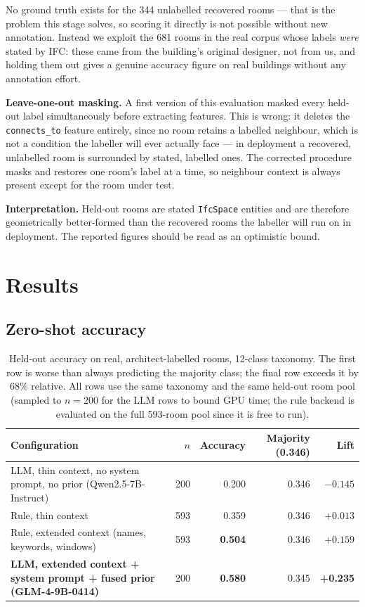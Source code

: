 \documentclass[11pt,a4paper]{article}
\begin{document}
No ground truth exists for the 344 unlabelled recovered rooms --- that is the
problem this stage solves, so scoring it directly is not possible without new
annotation. Instead we exploit the 681 rooms in the real corpus whose labels
\emph{were} stated by IFC: these came from the building's original designer,
not from us, and holding them out gives a genuine accuracy figure on real
buildings without any annotation effort.

\textbf{Leave-one-out masking.} A first version of this evaluation masked
every held-out label simultaneously before extracting features. This is
wrong: it deletes the \texttt{connects\_to} feature entirely, since no room
retains a labelled neighbour, which is not a condition the labeller will ever
actually face --- in deployment a recovered, unlabelled room is surrounded by
stated, labelled ones. The corrected procedure masks and restores one room's
label at a time, so neighbour context is always present except for the room
under test.

\textbf{Interpretation.} Held-out rooms are stated \texttt{IfcSpace} entities
and are therefore geometrically better-formed than the recovered rooms the
labeller will run on in deployment. The reported figures should be read as an
optimistic bound.

\section{Results}

\subsection{Zero-shot accuracy}

\begin{table}[h]
\centering
\small
\begin{tabular}{@{}lrrrr@{}}
\toprule
\textbf{Configuration} & $n$ & \textbf{Accuracy} & \textbf{Majority (0.346)} &
\textbf{Lift} \\
\midrule
LLM, thin context, no system prompt, no prior (Qwen2.5-7B-Instruct)
  & 200 & 0.200 & 0.346 & $-0.145$ \\
Rule, thin context & 593 & 0.359 & 0.346 & $+0.013$ \\
\addlinespace
Rule, extended context (names, keywords, windows)
  & 593 & \textbf{0.504} & 0.346 & $+0.159$ \\
\textbf{LLM, extended context + system prompt + fused prior}
  \textbf{(GLM-4-9B-0414)} & 200 & \textbf{0.580} & 0.345 & \textbf{+0.235} \\
\bottomrule
\end{tabular}
\caption{Held-out accuracy on real, architect-labelled rooms, 12-class
taxonomy. The first row is worse than always predicting the majority class;
the final row exceeds it by 68\% relative. All rows use the same taxonomy and
the same held-out room pool (sampled to $n{=}200$ for the LLM rows to bound
GPU time; the rule backend is evaluated on the full 593-room pool since it is
free to run).}
\label{tab:results}
\end{table}
\end{document}
